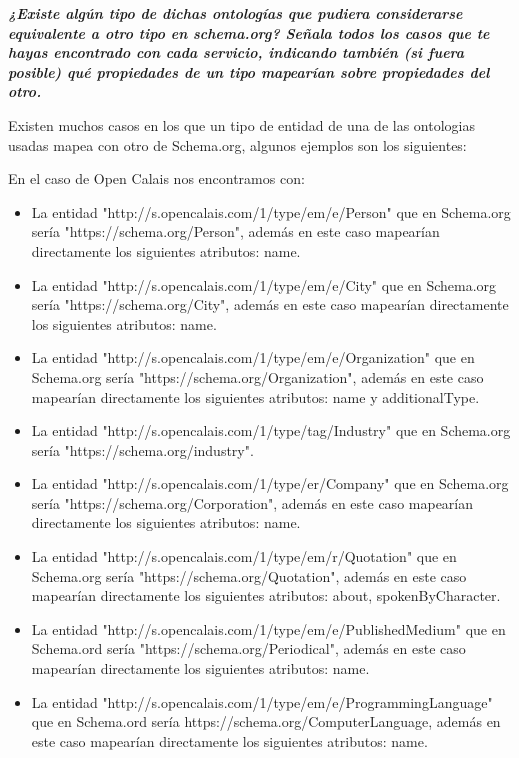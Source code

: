 \documentclass[spanish]{llncs}   %
\begin{document}
\textbf{\textit{¿Existe algún tipo de dichas ontologías que pudiera considerarse equivalente a otro tipo en schema.org? 
Señala todos los casos que te hayas encontrado con cada servicio, indicando también (si fuera posible) qué propiedades 
de un tipo mapearían sobre propiedades del otro.}}

Existen muchos casos en los que un tipo de entidad de una de las ontologias usadas mapea con otro de Schema.org, algunos ejemplos son los siguientes:

En el caso de Open Calais nos encontramos con: 
\begin{itemize}
    \item La entidad "http://s.opencalais.com/1/type/em/e/Person" que en Schema.org sería "https://schema.org/Person", además en 
    este caso mapearían directamente los siguientes atributos: name.
    \item La entidad "http://s.opencalais.com/1/type/em/e/City" que en Schema.org sería "https://schema.org/City", además en este caso 
    mapearían directamente los siguientes atributos: name.
    \item La entidad "http://s.opencalais.com/1/type/em/e/Organization" que en Schema.org sería "https://schema.org/Organization", además 
    en este caso mapearían directamente los siguientes atributos: name y additionalType.
    \item La entidad "http://s.opencalais.com/1/type/tag/Industry" que en Schema.org sería "https://schema.org/industry".
    \item La entidad "http://s.opencalais.com/1/type/er/Company" que en Schema.org sería "https://schema.org/Corporation", además 
    en este caso mapearían directamente los siguientes atributos: name.
    \item La entidad "http://s.opencalais.com/1/type/em/r/Quotation" que en Schema.org sería "https://schema.org/Quotation", además en 
    este caso mapearían directamente los siguientes atributos: about, spokenByCharacter.
    \item La entidad "http://s.opencalais.com/1/type/em/e/PublishedMedium" que en Schema.ord sería "https://schema.org/Periodical", además en 
    este caso mapearían directamente los siguientes atributos: name.
    \item La entidad "http://s.opencalais.com/1/type/em/e/ProgrammingLanguage" que en Schema.ord sería https://schema.org/ComputerLanguage, además en 
    este caso mapearían directamente los siguientes atributos: name.   
\end{itemize}
\end{document}
